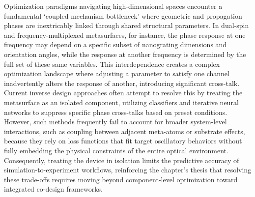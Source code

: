 \documentclass[11pt]{article}
\begin{document}
Optimization paradigms navigating high-dimensional spaces encounter a fundamental `coupled mechanism bottleneck' where geometric and propagation phases are inextricably linked through shared structural parameters. In dual-spin and frequency-multiplexed metasurfaces, for instance, the phase response at one frequency may depend on a specific subset of nanograting dimensions and orientation angles, while the response at another frequency is determined by the full set of these same variables. \citep{doi_10_1117_1_apn_2_1_016010_57069347} \citep{doi_10_1002_advs_202504634_52bafb6c} This interdependence creates a complex optimization landscape where adjusting a parameter to satisfy one channel inadvertently alters the response of another, introducing significant cross-talk. Current inverse design approaches often attempt to resolve this by treating the metasurface as an isolated component, utilizing classifiers and iterative neural networks to suppress specific phase cross-talks based on preset conditions. However, such methods frequently fail to account for broader system-level interactions, such as coupling between adjacent meta-atoms or substrate effects, because they rely on loss functions that fit target oscillatory behaviors without fully embedding the physical constraints of the entire optical environment. Consequently, treating the device in isolation limits the predictive accuracy of simulation-to-experiment workflows, reinforcing the chapter's thesis that resolving these trade-offs requires moving beyond component-level optimization toward integrated co-design frameworks. \citep{doi_10_1117_1_apn_2_1_016010_57069347} \citep{doi_10_1515_nanoph_2020_0379_1cc596ab}
\end{document}

